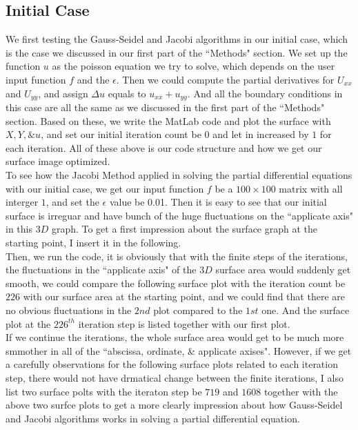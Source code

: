 \documentclass [a4paper, 12pt]{article}
\begin{document}
\subsection {Initial Case}
We first testing the Gauss-Seidel and Jacobi algorithms in our initial case, which is the case we discussed in our first part of the ``Methods" section. We set up the function $u$ as the poisson equation we try to solve, which depends on the user input function $f$ and the $\epsilon$. Then we could compute the partial derivatives for $U_{xx}$ and $U_{yy}$, and assign $\Delta u$ equals to $u_{xx}+u_{yy}$. And all the boundary conditions in this case are all the same as we discussed in the first part of the ``Methods" section. Based on these, we write the MatLab code and plot the surface with $X, Y, \& u$, and set our initial iteration count be $0$ and let in increased by $1$ for each iteration. All of these above is our code structure and how we get our surface image optimized. \\
To see how the Jacobi Method applied in solving the partial differential equations with our initial case, we get our input function $f$ be a $100 \times 100$ matrix with all interger $1$, and set the $\epsilon$ value be 0.01. Then it is easy to see that our initial surface is irreguar and have bunch of the huge fluctuations on the ``applicate axis" in this $3D$ graph. To get a first impression about the surface graph at the starting point, I insert it in the following. \\
Then, we run the code, it is obviously that with the finite steps of the iterations, the fluctuations in the ``applicate axis" of the $3D$ surface area would suddenly get smooth, we could compare the following surface plot with the iteration count be $226$ with our surface area at the starting point, and we could find that there are no obvious fluctuations in the $2nd$ plot compared to the $1st$ one. And the surface plot at the $226^{th}$ iteration step is listed together with our first plot. \\
If we continue the iterations, the whole surface area would get to be much more smmother in all of the ``abscissa, ordinate, \& applicate axises". However, if we get a carefully observations for the following surface plots related to each iteration step, there would not have drmatical change between the finite iterations, I also list two surface polts with the iteraton step be $719$ and $1608$ together with the above two surfce plots to get a more clearly impression about how Gauss-Seidel and Jacobi algorithms works in solving a partial differential equation. 
\end{document}
